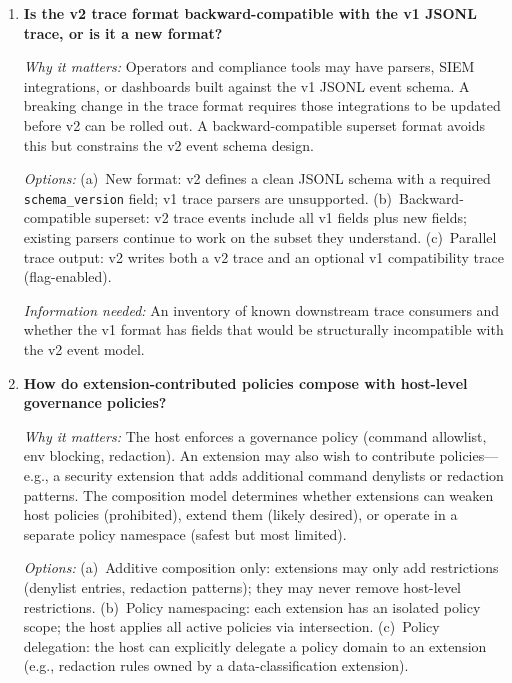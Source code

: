 \begin{enumerate}[label=\textbf{Q\arabic*.}]
    \textit{Information needed:} Whether the VS~Code extension use case requires concurrent runs in a
    single \texttt{gert serve} process (e.g., multiple open runbook panels), and what the goroutine
    safety requirements are for the trace writer and governance layer.

  \item \textbf{Is the v2 trace format backward-compatible with the v1 JSONL trace, or is it a new format?}

    \textit{Why it matters:} Operators and compliance tools may have parsers, SIEM integrations, or
    dashboards built against the v1 JSONL event schema. A breaking change in the trace format requires
    those integrations to be updated before v2 can be rolled out. A backward-compatible superset format
    avoids this but constrains the v2 event schema design.

    \textit{Options:} (a)~New format: v2 defines a clean JSONL schema with a required
    \texttt{schema\_version} field; v1 trace parsers are unsupported. (b)~Backward-compatible superset:
    v2 trace events include all v1 fields plus new fields; existing parsers continue to work on the
    subset they understand. (c)~Parallel trace output: v2 writes both a v2 trace and an optional v1
    compatibility trace (flag-enabled).

    \textit{Information needed:} An inventory of known downstream trace consumers and whether the v1
    format has fields that would be structurally incompatible with the v2 event model.

  \item \textbf{How do extension-contributed policies compose with host-level governance policies?}

    \textit{Why it matters:} The host enforces a governance policy (command allowlist, env blocking,
    redaction). An extension may also wish to contribute policies---e.g., a security extension that
    adds additional command denylists or redaction patterns. The composition model determines whether
    extensions can weaken host policies (prohibited), extend them (likely desired), or operate in a
    separate policy namespace (safest but most limited).

    \textit{Options:} (a)~Additive composition only: extensions may only add restrictions (denylist
    entries, redaction patterns); they may never remove host-level restrictions. (b)~Policy
    namespacing: each extension has an isolated policy scope; the host applies all active policies
    via intersection. (c)~Policy delegation: the host can explicitly delegate a policy domain to an
    extension (e.g., redaction rules owned by a data-classification extension).


\end{enumerate}
